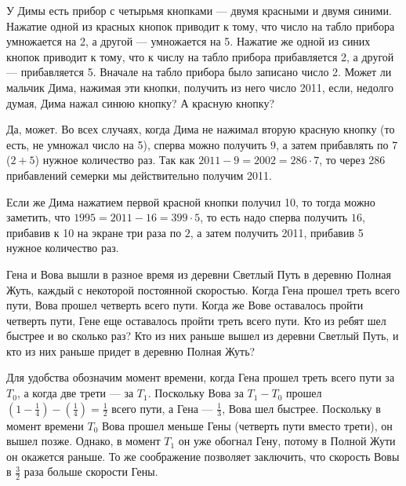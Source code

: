 ﻿

\begin{itemize}
\itC У Димы есть прибор с четырьмя кнопками --- двумя красными и двумя синими. Нажатие 
одной из красных кнопок приводит к тому, что число на табло прибора умножается на 2, 
а другой --- умножается на 5. Нажатие же одной из синих кнопок приводит к тому, что к числу 
на табло прибора прибавляется 2, а другой --- прибавляется 5. Вначале на табло прибора 
было записано число 2. Может ли мальчик Дима, нажимая эти кнопки, получить из него число 
2011, если, недолго думая, Дима нажал синюю кнопку? А красную кнопку?

\itr Да, может. Во всех случаях, когда Дима не нажимал вторую красную кнопку (то есть, не
умножал число на 5), сперва можно получить $9$, а затем прибавлять по 7 ($2+5$) нужное
количество раз. Так как $2011-9 = 2002 = 286 \cdot 7$, то через 286 прибавлений семерки
мы действительно получим 2011.

Если же Дима нажатием первой красной кнопки получил 10, то тогда можно заметить, что 
$1995 = 2011-16 = 399 \cdot 5$, то есть надо сперва получить $16$, прибавив к 10 на экране
три раза по $2$, а затем получить 2011, прибавив 5 нужное количество раз.
\end{itemize}

\begin{itemize}
\itC Гена и Вова вышли в разное время из деревни Светлый Путь в деревню Полная Жуть, каждый с некоторой 
постоянной скоростью. Когда Гена прошел треть всего пути, Вова прошел четверть всего 
пути. Когда же Вове оставалось пройти четверть пути, Гене еще оставалось пройти треть 
всего пути. Кто из ребят шел быстрее и во сколько раз? Кто из них раньше вышел из деревни
Светлый Путь, и кто из них раньше придет в деревню Полная Жуть?

\itr Для удобства обозначим момент времени, когда Гена прошел треть всего пути за $T_0$, 
а когда две трети --- за $T_1$. Поскольку Вова за $T_1-T_0$ прошел 
$(1-\frac{1}{4})-(\frac{1}{4}) = \frac{1}{2}$ всего пути, 
а Гена --- $\frac{1}{3}$, Вова шел быстрее. Поскольку в момент времени $T_0$ 
Вова прошел меньше Гены (четверть пути вместо трети), он вышел позже. Однако, 
в момент $T_1$ он уже обогнал Гену, потому в Полной Жути он окажется раньше.
То же соображение позволяет заключить, что скорость Вовы в $\frac{3}{2}$ раза больше
скорости Гены.
\end{itemize}

